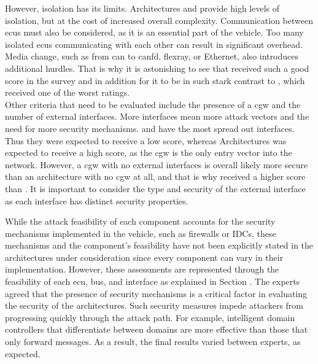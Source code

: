 However, isolation has its limits.
Architectures  and  provide high levels of isolation, but at the cost of increased overall complexity.
Communication between \acrshort{ecu}s must also be considered, as it is an essential part of the vehicle. 
Too many isolated \acrshort{ecu}s communicating with each other can result in significant overhead. 
Media change, such as from \acrshort{can} to \acrshort{canfd}, \acrshort{flexray}, or Ethernet, also introduces additional hurdles.
That is why it is astonishing to see that  received such a good score in the survey
and in addition for it to be in such stark contrast to , which received one of the worst ratings.\\

Other criteria that need to be evaluated include the presence of a \acrshort{cgw} and the number of external interfaces. More interfaces mean more attack vectors and the need for more security mechanisms.
 and  have the most spread out interfaces. Thus they were expected to receive a low score,
whereas Architectures  was expected to receive a high score, as the \acrshort{cgw} is the only entry vector into the network.
However, a \acrshort{cgw} with no external interfaces is overall likely more secure than an architecture with no \acrshort{cgw} at all, and that is why 
 received a higher score than . 
It is important to consider the type and security of the external interface as each interface has distinct security properties.

While the attack feasibility of each component accounts for the security mechanisms implemented in the vehicle, such as firewalls or IDCs, 
these mechanisms and the component's feasibility have not been explicitly stated in the architectures under consideration since every component can vary in their implementation.
However, these assessments are represented through the feasibility of each \acrshort{ecu}, bus, and interface as explained in Section .
The experts agreed that the presence of security mechanisms is a critical factor in evaluating the security of the architectures.
Such security measures impede attackers from progressing quickly through the attack path. 
For example, intelligent domain controllers that differentiate between domains are more effective than those that only forward messages.
As a result, the final results varied between experts, as expected.\\

